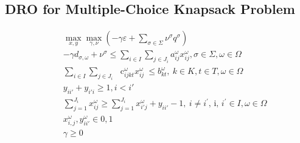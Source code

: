 \subsection{DRO for Multiple-Choice Knapsack Problem}
\label{subsec:DRO_MCKP}

\vst {}
\begin{subequations}\label{DROMCKP}
\begin{eqnarray}
& & \max_{x, y} \max_{\gamma, \nu} (-\gamma \varepsilon + \sum_{\sigma \in \Sigma} \nu^\sigma q^\sigma)  \\
& &  -\gamma d_{\sigma, \omega} + \nu^\sigma \le \sum _{i \in I}^{} \sum _{j \in J_{i}}^{}a_{ij}^{ \omega }x_{ij}^{ \omega }, \sigma \in \Sigma, \omega \in \Omega \\
& & \sum _{i \in I}^{} \sum _{j \in J_{i}}^{}\text{~ c}_{ijkt}^{ \omega }x_{ij}^{ \omega }~  \leq  b_{kt}^{ \omega },~ k \in K, t \in T,  \omega  \in  \Omega \\
& & y_{ii'} + y_{i'i} \geq 1, i<i'  \\
& & \sum_{j=1}^{J_i} x_{ij}^\omega \geq \sum_{j=1}^{J_i} x_{i'j}^\omega + y_{ii'} -1,~ i \neq i^{'}\text{, i, }i^{'} \in I,  \omega  \in  \Omega \\
& & x_{i,j}^\omega, y_{ii'}^\omega \in {0, 1} \\
& & \gamma \ge 0
\end{eqnarray}
\end{subequations}


